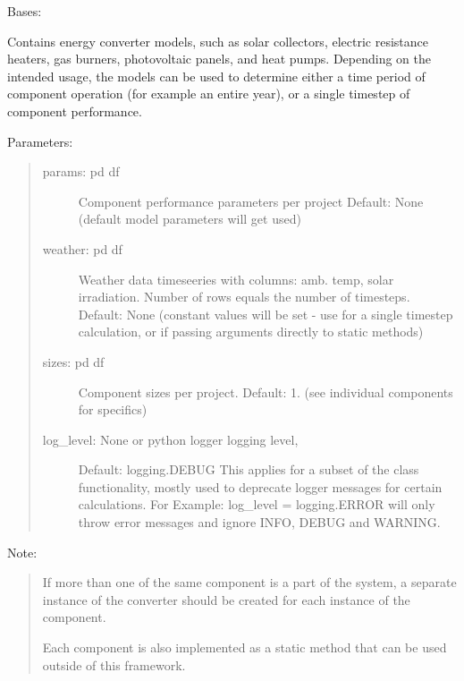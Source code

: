 \documentclass[letterpaper,10pt,english,openany]{sphinxmanual}
\begin{document}
\begin{fulllineitems}
\label{\detokenize{source/mswh.system:mswh.system.components.Converter}}
Bases: 

Contains energy converter models, such as
solar collectors, electric resistance heaters, gas burners,
photovoltaic panels, and heat pumps. Depending on the intended
usage, the models can be used to determine either a time period
of component operation (for example an entire year), or a single
timestep of component performance.

Parameters:
\begin{quote}
\begin{description}
\item[{params: pd df}] \leavevmode
Component performance parameters per project
Default: None (default model parameters will get used)

\item[{weather: pd df}] \leavevmode
Weather data timeseeries with columns: amb. temp,
solar irradiation. Number of rows equals the number of timesteps.
Default: None (constant values will be set - use for
a single timestep calculation, or if passing arguments
directly to static methods)

\item[{sizes: pd df}] \leavevmode
Component sizes per project.
Default: 1. (see individual components for specifics)

\item[{log\_level: None or python logger logging level,}] \leavevmode
Default: logging.DEBUG
This applies for a subset of the class functionality, mostly
used to deprecate logger messages for certain calculations.
For Example: log\_level = logging.ERROR will only throw error
messages and ignore INFO, DEBUG and WARNING.

\end{description}
\end{quote}

Note:
\begin{quote}

If more than one of the same component is a part of the
system, a separate instance of the converter should
be created for each instance of the component.

Each component is also implemented as a static method that
can be used outside of this framework.
\end{quote}


\end{fulllineitems}
\end{document}
